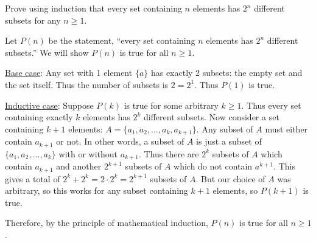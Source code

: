 \begin{questions}
	

%

\question Prove using induction that every set containing $n$ elements has $2^n$ different subsets for any $n \ge 1$.

	\begin{answer}
		Let $P(n)$ be the statement, ``every set containing $n$ elements has $2^n$ different subsets.''  We will show $P(n)$ is true for all $n \ge 1$.
		
		\underline{Base case}: Any set with 1 element $\{a\}$ has exactly 2 subsets: the empty set and the set itself.  Thus the number of subsets is $2= 2^1$.  Thus $P(1)$ is true.
		
		\underline{Inductive case}: Suppose $P(k)$ is true for some arbitrary $k \ge 1$.  Thus every set containing exactly $k$ elements has $2^k$ different subsets.  Now consider a set containing $k+1$ elements: $A = \{a_1, a_2, \ldots, a_k, a_{k+1}\}$.  Any subset of $A$ must either contain $a_{k+1}$ or not.  In other words, a subset of $A$ is just a subset of $\{a_1, a_2,\ldots, a_k\}$ with or without $a_{k+1}$.  Thus there are $2^k$ subsets of $A$ which contain $a_{k+1}$ and another $2^{k+1}$ subsets of $A$ which do not contain $a^{k+1}$.  This gives a total of $2^k + 2^k = 2\cdot 2^k = 2^{k+1}$ subsets of $A$.  But our choice of $A$ was arbitrary, so this works for any subset containing $k+1$ elements, so $P(k+1)$ is true.
		
		Therefore, by the principle of mathematical induction, $P(n)$ is true for all $n \ge 1$.
	\end{answer}	
	
	
	
\end{questions}